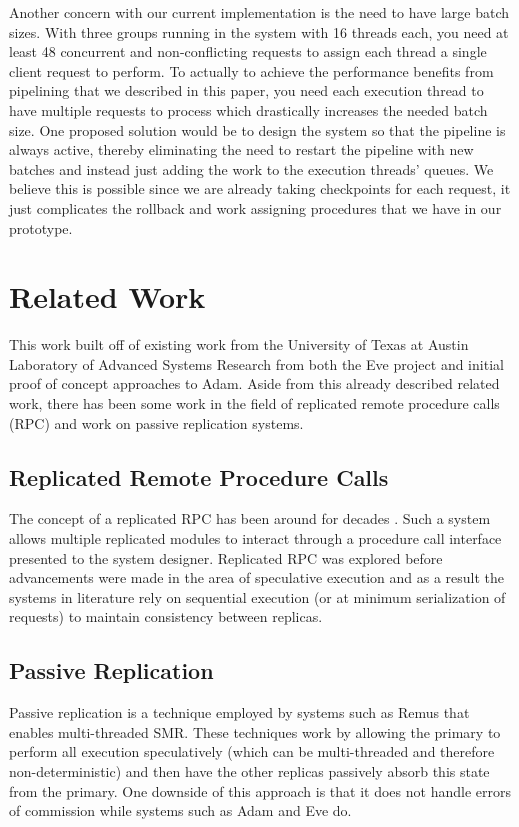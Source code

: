 \documentclass[11pt, oneside]{report}
\begin{document}
Another concern with our current implementation is the need to have large batch sizes. With three groups running in the system with 16 threads each, you need at least 48 concurrent and non-conflicting requests to assign each thread a single client request to perform. To actually to achieve the performance benefits from pipelining that we described in this paper, you need each execution thread to have multiple requests to process which drastically increases the needed batch size. One proposed solution would be to design the system so that the pipeline is always active, thereby eliminating the need to restart the pipeline with new batches and instead just adding the work to the execution threads' queues. We believe this is possible since we are already taking checkpoints for each request, it just complicates the rollback and work assigning procedures that we have in our prototype.

\chapter{Related Work}\label{RelatedWork}

This work built off of existing work from the University of Texas at Austin Laboratory of Advanced Systems Research from both the Eve project and initial proof of concept approaches to Adam. Aside from this already described related work, there has been some work in the field of replicated remote procedure calls (RPC) and work on passive replication systems.

\section{Replicated Remote Procedure Calls}

The concept of a replicated RPC has been around for decades \cite{rrpc, ftrpc}.
Such a system allows multiple replicated modules to interact through a procedure call interface presented to the system designer.
Replicated RPC was explored before advancements were made in the area of speculative execution and as a result the systems in literature rely on sequential execution (or at minimum serialization of requests) to maintain consistency between replicas. 

\section{Passive Replication}

Passive replication is a technique employed by systems such as Remus \cite{remus} that enables multi-threaded SMR. 
These techniques work by allowing the primary to perform all execution speculatively (which can be multi-threaded and therefore non-deterministic) and then have the other replicas passively absorb this state from the primary.
One downside of this approach is that it does not handle errors of commission  while systems such as Adam and Eve do.
\end{document}
